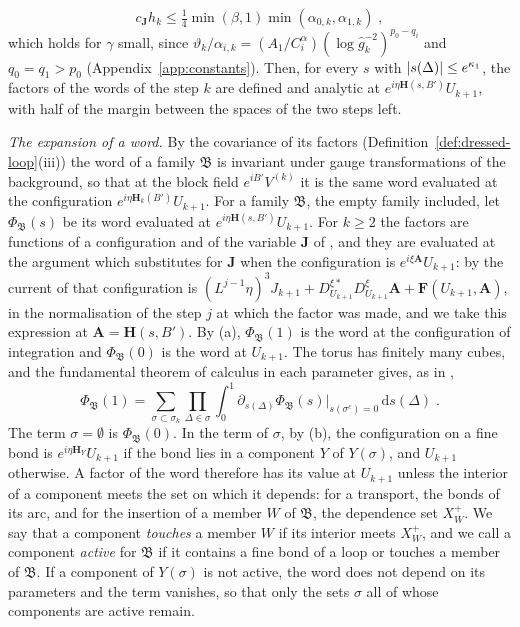 \documentclass[11pt]{preprint}
\newcommand{\dd}{\mathrm{d}}
\DeclarePairedDelimiter{\abs}{\lvert}{\rvert}
\numberwithin{equation}{section}
\theoremstyle{definition}
\theoremstyle{remark}
\theoremstyle{plain}
\begin{document}
\begin{equation}\label{eq:expansion-condition}
    c_{\mathbf J}h_k \leq \tfrac14\min(\beta, 1)\min(\alpha_{0,k}, \alpha_{1,k})\;,
\end{equation}
which holds for $\gamma$ small, since $\vartheta_k/\alpha_{i,k} = (A_1/C^\alpha_i)(\log\hat g_k^{-2})^{p_0 - q_i}$ and $q_0 = q_1 > p_0$ (Appendix~\ref{app:constants}). Then, for every $s$ with $\abs{s(\Delta)} \leq e^{\kappa_1}$, the factors of the words of the step $k$ are defined and analytic at $e^{i\eta\mathbf H(s, B')}U_{k+1}$, with half of the margin between the spaces of the two steps left.

\emph{The expansion of a word.} By the covariance of its factors (Definition~\ref{def:dressed-loop}(iii)) the word of a family $\mathfrak B$ is invariant under gauge transformations of the background, so that at the block field $e^{iB'}V^{(k)}$ it is the same word evaluated at the configuration $e^{i\eta\mathbf H_k(B')}U_{k+1}$. For a family $\mathfrak B$, the empty family included, let $\Phi_{\mathfrak B}(s)$ be its word evaluated at $e^{i\eta\mathbf H(s, B')}U_{k+1}$. For $k \geq 2$ the factors are functions of a configuration and of the variable $\mathbf J$ of \cite[(2.36), p.~261]{BalabanCRE}, and they are evaluated at the argument which \cite[(3.10)--(3.13), p.~272]{BalabanRG1} substitutes for $\mathbf J$ when the configuration is $e^{i\xi\mathbf A}U_{k+1}$: by \cite[(3.11), (3.12)]{BalabanRG1} the current of that configuration is $(L^{j-1}\eta)^3J_{k+1} + D^{\xi*}_{U_{k+1}}D^\xi_{U_{k+1}}\mathbf A + \mathbf F(U_{k+1}, \mathbf A)$, in the normalisation of the step $j$ at which the factor was made, and we take this expression at $\mathbf A = \mathbf H(s, B')$. By (a), $\Phi_{\mathfrak B}(1)$ is the word at the configuration of integration and $\Phi_{\mathfrak B}(0)$ is the word at $U_{k+1}$. The torus has finitely many cubes, and the fundamental theorem of calculus in each parameter gives, as in \cite[(1.9), p.~4]{BalabanRG2},
\begin{equation}\label{eq:parameter-expansion}
    \Phi_{\mathfrak B}(1) = \sum_{\sigma \subset \sigma_k}\prod_{\Delta \in \sigma}\int_0^1\partial_{s(\Delta)}\Phi_{\mathfrak B}(s)\big|_{s(\sigma^c) = 0}\,\dd s(\Delta)\;.
\end{equation}
The term $\sigma = \emptyset$ is $\Phi_{\mathfrak B}(0)$. In the term of $\sigma$, by (b), the configuration on a fine bond is $e^{i\eta\mathbf H_Y}U_{k+1}$ if the bond lies in a component $Y$ of $Y(\sigma)$, and $U_{k+1}$ otherwise. A factor of the word therefore has its value at $U_{k+1}$ unless the interior of a component meets the set on which it depends: for a transport, the bonds of its arc, and for the insertion of a member $W$ of $\mathfrak B$, the dependence set $X^+_W$. We say that a component \emph{touches} a member $W$ if its interior meets $X^+_W$, and we call a component \emph{active} for $\mathfrak B$ if it contains a fine bond of a loop or touches a member of $\mathfrak B$. If a component of $Y(\sigma)$ is not active, the word does not depend on its parameters and the term vanishes, so that only the sets $\sigma$ all of whose components are active remain.
\end{document}
